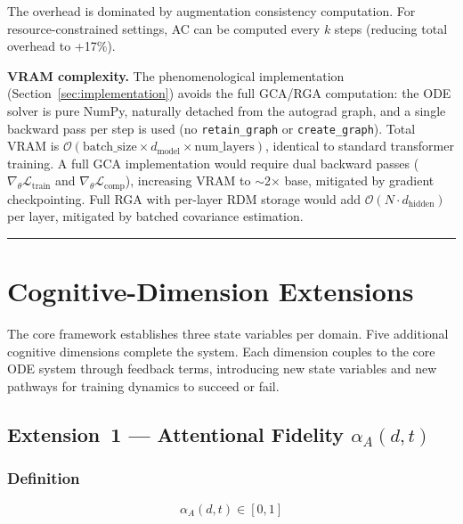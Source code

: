 \documentclass[11pt]{article}
\theoremstyle{definition}
\theoremstyle{plain}
\begin{document}
The overhead is dominated by augmentation consistency computation.
For resource-constrained settings, AC can be computed every $k$ steps
(reducing total overhead to +17\%).

\textbf{VRAM complexity.} The phenomenological implementation (Section~\ref{sec:implementation})
avoids the full GCA/RGA computation: the ODE solver is pure NumPy, naturally
detached from the autograd graph, and a single backward pass per step is used
(no \texttt{retain\_graph} or \texttt{create\_graph}). Total VRAM is
$\mathcal{O}(\text{batch\_size} \times d_{\text{model}} \times
\text{num\_layers})$, identical to standard transformer training.
A full GCA implementation would require dual backward passes
($\nabla_\theta\mathcal{L}_{\text{train}}$ and
$\nabla_\theta\mathcal{L}_{\text{comp}}$), increasing VRAM to
$\sim$2$\times$ base, mitigated by gradient checkpointing.
Full RGA with per-layer RDM storage would add
$\mathcal{O}(N \cdot d_{\text{hidden}})$ per layer, mitigated by batched
covariance estimation.

\noindent\rule{\linewidth}{0.4pt}



\section{Cognitive-Dimension Extensions}\label{sec:cognitive}

The core framework establishes three state variables per domain. Five
additional cognitive dimensions complete the system. Each dimension couples to the core ODE system through feedback terms, introducing new state variables and new pathways for training dynamics to succeed or fail.

\subsection{Extension~1 --- Attentional Fidelity \texorpdfstring{$\alpha_A(d,t)$}{alpha\_A(d,t)}}\label{sec:attention}

\subsubsection{Definition}
\begin{equation}\label{eq:alpha-bounds}
\alpha_A(d,t) \in [0,1]
\end{equation}
\end{document}
